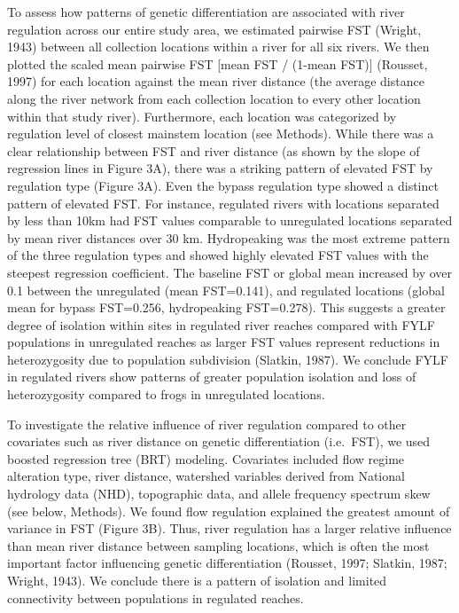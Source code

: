 \documentclass[twoside,12pt,final]{ucthesis-CA2012} %
\begin{document}
\begin{ucmainmatter}
To assess how patterns of genetic differentiation are associated with
river regulation across our entire study area, we estimated pairwise FST
(Wright, 1943) between all collection locations within a river for all
six rivers. We then plotted the scaled mean pairwise FST {[}mean FST /
(1-mean FST){]} (Rousset, 1997) for each location against the mean river
distance (the average distance along the river network from each
collection location to every other location within that study river).
Furthermore, each location was categorized by regulation level of
closest mainstem location (see Methods). While there was a clear
relationship between FST and river distance (as shown by the slope of
regression lines in Figure 3A), there was a striking pattern of elevated
FST by regulation type (Figure 3A). Even the bypass regulation type
showed a distinct pattern of elevated FST. For instance, regulated
rivers with locations separated by less than 10km had FST values
comparable to unregulated locations separated by mean river distances
over 30 km. Hydropeaking was the most extreme pattern of the three
regulation types and showed highly elevated FST values with the steepest
regression coefficient. The baseline FST or global mean increased by
over 0.1 between the unregulated (mean FST=0.141), and regulated
locations (global mean for bypass FST=0.256, hydropeaking FST=0.278).
This suggests a greater degree of isolation within sites in regulated
river reaches compared with FYLF populations in unregulated reaches as
larger FST values represent reductions in heterozygosity due to
population subdivision (Slatkin, 1987). We conclude FYLF in regulated
rivers show patterns of greater population isolation and loss of
heterozygosity compared to frogs in unregulated locations.

To investigate the relative influence of river regulation compared to
other covariates such as river distance on genetic differentiation
(i.e.~FST), we used boosted regression tree (BRT) modeling. Covariates
included flow regime alteration type, river distance, watershed
variables derived from National hydrology data (NHD), topographic data,
and allele frequency spectrum skew (see below, Methods). We found flow
regulation explained the greatest amount of variance in FST (Figure 3B).
Thus, river regulation has a larger relative influence than mean river
distance between sampling locations, which is often the most important
factor influencing genetic differentiation (Rousset, 1997; Slatkin,
1987; Wright, 1943). We conclude there is a pattern of isolation and
limited connectivity between populations in regulated reaches.


\end{ucmainmatter}
\end{document}
